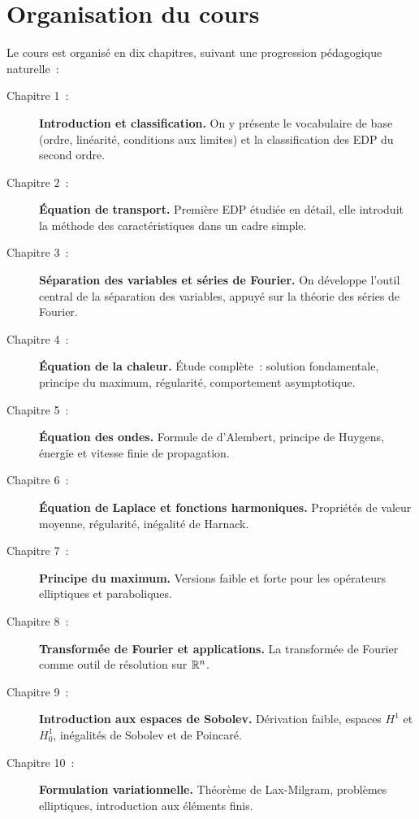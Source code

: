 \section*{Organisation du cours}

Le cours est organis\'e en dix chapitres, suivant une progression p\'edagogique
naturelle~:

\begin{description}
    \item[Chapitre 1~:] \textbf{Introduction et classification.} On y pr\'esente
        le vocabulaire de base (ordre, lin\'earit\'e, conditions aux limites) et la
        classification des EDP du second ordre.

    \item[Chapitre 2~:] \textbf{\'Equation de transport.} Premi\`ere EDP \'etudi\'ee
        en d\'etail, elle introduit la m\'ethode des caract\'eristiques dans un
        cadre simple.

    \item[Chapitre 3~:] \textbf{S\'eparation des variables et s\'eries de Fourier.}
        On d\'eveloppe l'outil central de la s\'eparation des variables, appuy\'e
        sur la th\'eorie des s\'eries de Fourier.

    \item[Chapitre 4~:] \textbf{\'Equation de la chaleur.} \'Etude compl\`ete~:
        solution fondamentale, principe du maximum, r\'egularit\'e,
        comportement asymptotique.

    \item[Chapitre 5~:] \textbf{\'Equation des ondes.} Formule de d'Alembert,
        principe de Huygens, \'energie et vitesse finie de propagation.

    \item[Chapitre 6~:] \textbf{\'Equation de Laplace et fonctions harmoniques.}
        Propri\'et\'es de valeur moyenne, r\'egularit\'e, in\'egalit\'e de Harnack.

    \item[Chapitre 7~:] \textbf{Principe du maximum.} Versions faible et forte
        pour les op\'erateurs elliptiques et paraboliques.

    \item[Chapitre 8~:] \textbf{Transform\'ee de Fourier et applications.}
        La transform\'ee de Fourier comme outil de r\'esolution sur $\mathbb{R}^n$.

    \item[Chapitre 9~:] \textbf{Introduction aux espaces de Sobolev.}
        D\'erivation faible, espaces $H^1$ et $H^1_0$, in\'egalit\'es de Sobolev
        et de Poincar\'e.

    \item[Chapitre 10~:] \textbf{Formulation variationnelle.}
        Th\'eor\`eme de Lax-Milgram, probl\`emes elliptiques, introduction aux
        \'el\'ements finis.
\end{description}

